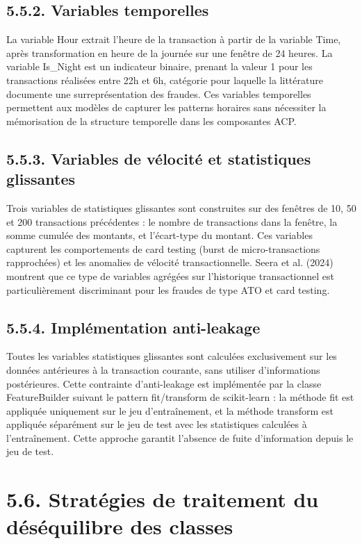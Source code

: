 \subsection{5.5.2. Variables temporelles}

La variable Hour extrait l'heure de la transaction à partir de la variable Time, après transformation en heure de la journée sur une fenêtre de 24 heures. La variable Is\_Night est un indicateur binaire, prenant la valeur 1 pour les transactions réalisées entre 22h et 6h, catégorie pour laquelle la littérature documente une surreprésentation des fraudes. Ces variables temporelles permettent aux modèles de capturer les patterns horaires sans nécessiter la mémorisation de la structure temporelle dans les composantes ACP.

\subsection{5.5.3. Variables de vélocité et statistiques glissantes}

Trois variables de statistiques glissantes sont construites sur des fenêtres de 10, 50 et 200 transactions précédentes : le nombre de transactions dans la fenêtre, la somme cumulée des montants, et l'écart-type du montant. Ces variables capturent les comportements de card testing (burst de micro-transactions rapprochées) et les anomalies de vélocité transactionnelle. Seera et al. (2024) montrent que ce type de variables agrégées sur l'historique transactionnel est particulièrement discriminant pour les fraudes de type ATO et card testing.

\subsection{5.5.4. Implémentation anti-leakage}

Toutes les variables statistiques glissantes sont calculées exclusivement sur les données antérieures à la transaction courante, sans utiliser d'informations postérieures. Cette contrainte d'anti-leakage est implémentée par la classe FeatureBuilder suivant le pattern fit/transform de scikit-learn : la méthode fit est appliquée uniquement sur le jeu d'entraînement, et la méthode transform est appliquée séparément sur le jeu de test avec les statistiques calculées à l'entraînement. Cette approche garantit l'absence de fuite d'information depuis le jeu de test.

\section{5.6. Stratégies de traitement du déséquilibre des classes}

